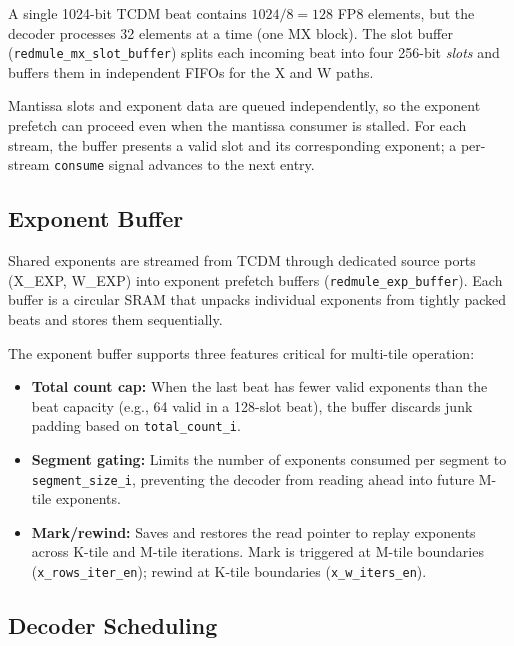 A single 1024-bit TCDM beat contains $1024/8 = 128$ FP8 elements, but the
decoder processes 32 elements at a time (one MX block). The slot buffer
(\texttt{redmule\_mx\_slot\_buffer}) splits each incoming beat into four
256-bit \emph{slots} and buffers them in independent FIFOs for the X and W
paths.

Mantissa slots and exponent data are queued independently, so the exponent
prefetch can proceed even when the mantissa consumer is stalled. For each
stream, the buffer presents a valid slot and its corresponding exponent; a
per-stream \texttt{consume} signal advances to the next entry.

\subsection{Exponent Buffer}
\label{ssec:exp-buffer}

Shared exponents are streamed from TCDM through dedicated source ports
(X\_EXP, W\_EXP) into exponent prefetch buffers
(\texttt{redmule\_exp\_buffer}). Each buffer is a circular SRAM that unpacks
individual exponents from tightly packed beats and stores them sequentially.

The exponent buffer supports three features critical for multi-tile operation:

\begin{itemize}
    \item \textbf{Total count cap:} When the last beat has fewer valid exponents
          than the beat capacity (e.g., 64 valid in a 128-slot beat), the buffer
          discards junk padding based on \texttt{total\_count\_i}.
    \item \textbf{Segment gating:} Limits the number of exponents consumed
          per segment to \texttt{segment\_size\_i}, preventing the decoder from
          reading ahead into future M-tile exponents.
    \item \textbf{Mark/rewind:} Saves and restores the read pointer to replay
          exponents across K-tile and M-tile iterations. Mark is triggered at
          M-tile boundaries (\texttt{x\_rows\_iter\_en}); rewind at K-tile
          boundaries (\texttt{x\_w\_iters\_en}).
\end{itemize}

\subsection{Decoder Scheduling}
\label{ssec:decoder-scheduling}


